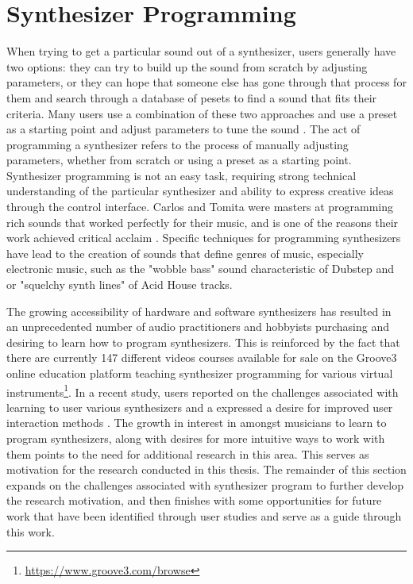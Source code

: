 \section{Synthesizer Programming}
\label{section:synth-programming}

When trying to get a particular sound out of a synthesizer, users generally have two options: they can try to build up the sound from scratch by adjusting parameters, or they can hope that someone else has gone through that process for them and search through a database of pesets to find a sound that fits their criteria. Many users use a combination of these two approaches and use a preset as a starting point and adjust parameters to tune the sound \cite{krekovic2019insights}. The act of programming a synthesizer refers to the process of manually adjusting parameters, whether from scratch or using a preset as a starting point. Synthesizer programming is not an easy task, requiring strong technical understanding of the particular synthesizer and ability to express creative ideas through the control interface. Carlos and Tomita were masters at programming rich sounds that worked perfectly for their music, and is one of the reasons their work achieved critical acclaim \cite{jenkins2019analog}. Specific techniques for programming synthesizers have lead to the creation of sounds that define genres of music, especially electronic music, such as the "wobble bass" sound characteristic of Dubstep and or "squelchy synth lines" of Acid House tracks. 

The growing accessibility of hardware and software synthesizers has resulted in an unprecedented number of audio practitioners and hobbyists purchasing and desiring to learn how to program synthesizers. This is reinforced by the fact that there are currently 147 different videos courses available for sale on the Groove3 online education platform teaching synthesizer programming for various virtual instruments\footnote{\url{https://www.groove3.com/browse}}. In a recent study, users reported on the challenges associated with learning to user various synthesizers and a expressed a desire for improved user interaction methods \cite{krekovic2019insights}. The growth in interest in amongst musicians to learn to program synthesizers, along with desires for more intuitive ways to work with them points to the need for additional research in this area. This serves as motivation for the research conducted in this thesis. The remainder of this section expands on the challenges associated with synthesizer program to further develop the research motivation, and then finishes with some opportunities for future work that have been identified through user studies and serve as a guide through this work.

